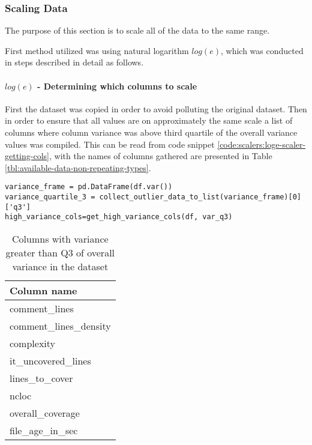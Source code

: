 \subsubsection{Scaling Data}
The purpose of this section is to scale all of the data to the same range. 

First method utilized was using natural logarithm $log(e)$, which was conducted in steps described in detail as follows.
\paragraph{$log(e)$ - Determining which columns to scale}
First the dataset was copied in order to avoid polluting the original dataset. Then in order to ensure that all values are on approximately the same scale a list of columns where column variance was above third quartile of the overall variance values was compiled. This can be read from code snippet \ref{code:scalers:loge-scaler-getting-cols}, with the names of columns gathered are presented in Table \ref{tbl:available-data-non-repeating-types}.

\begin{code}
\label{code:scalers:loge-scaler-getting-cols}
\begin{verbatim}
variance_frame = pd.DataFrame(df.var())
variance_quartile_3 = collect_outlier_data_to_list(variance_frame)[0]['q3']
high_variance_cols=get_high_variance_cols(df, var_q3)
\end{verbatim}
\end{code}

\begin{table}[!h]
\centering
\caption{Columns with variance greater than Q3 of overall variance in the dataset}
\label{tab:loge-scaler-cols-aboveq3}
\begin{tabular}{@{}l@{}}
\toprule
Column name \\ \midrule
comment\_lines \\
comment\_lines\_density \\
complexity \\
it\_uncovered\_lines \\
lines\_to\_cover \\
ncloc \\
overall\_coverage \\
file\_age\_in\_sec \\ \bottomrule
\end{tabular}
\end{table}


